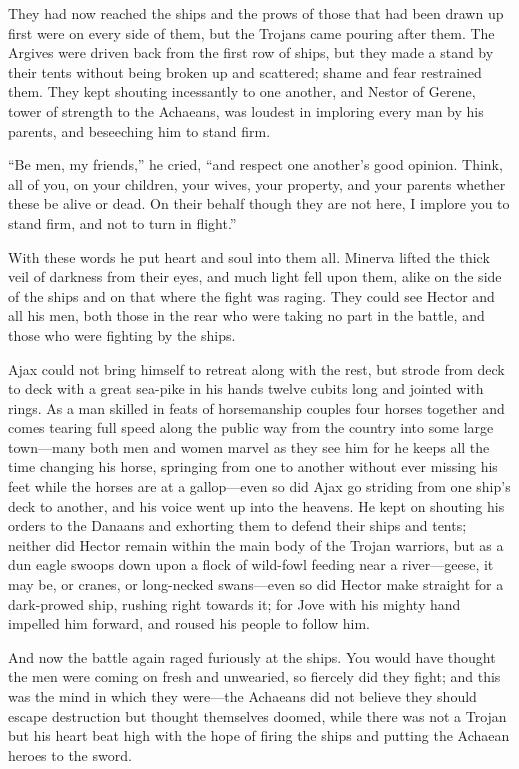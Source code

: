 They had now reached the ships and the prows of those that had been drawn
up first were on every side of them, but the Trojans came pouring after
them. The Argives were driven back from the first row of ships, but they
made a stand by their tents without being broken up and scattered; shame
and fear restrained them. They kept shouting incessantly to one another,
and Nestor of Gerene, tower of strength to the Achaeans, was loudest in
imploring every man by his parents, and beseeching him to stand firm.

“Be men, my friends,” he cried, “and respect one another’s good opinion.
Think, all of you, on your children, your wives, your property, and your
parents whether these be alive or dead. On their behalf though they are
not here, I implore you to stand firm, and not to turn in flight.”

With these words he put heart and soul into them all. Minerva lifted the
thick veil of darkness from their eyes, and much light fell upon them,
alike on the side of the ships and on that where the fight was raging.
They could see Hector and all his men, both those in the rear who were
taking no part in the battle, and those who were fighting by the ships.

Ajax could not bring himself to retreat along with the rest, but strode
from deck to deck with a great sea-pike in his hands twelve cubits long
and jointed with rings. As a man skilled in feats of horsemanship couples
four horses together and comes tearing full speed along the public way
from the country into some large town—many both men and women marvel
as they see him for he keeps all the time changing his horse, springing
from one to another without ever missing his feet while the horses are at
a gallop—even so did Ajax go striding from one ship’s deck to
another, and his voice went up into the heavens. He kept on shouting his
orders to the Danaans and exhorting them to defend their ships and tents;
neither did Hector remain within the main body of the Trojan warriors, but
as a dun eagle swoops down upon a flock of wild-fowl feeding near a river—geese,
it may be, or cranes, or long-necked swans—even so did Hector make
straight for a dark-prowed ship, rushing right towards it; for Jove with
his mighty hand impelled him forward, and roused his people to follow him.

And now the battle again raged furiously at the ships. You would have
thought the men were coming on fresh and unwearied, so fiercely did they
fight; and this was the mind in which they were—the Achaeans did not
believe they should escape destruction but thought themselves doomed,
while there was not a Trojan but his heart beat high with the hope of
firing the ships and putting the Achaean heroes to the sword.

